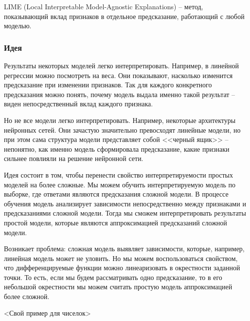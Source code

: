 LIME (Local Interpretable Model-Agnostic Explanations) -- метод, показывающий вклад признаков в отдельное предсказание, работающий с любой моделью.

\subsubsection{Идея}
Результаты некоторых моделей легко интерпретировать. Например, в линейной регрессии можно посмотреть на веса. Они показывают, насколько изменится предсказание при изменении признаков. Так для каждого конкретного предсказания можно понять, почему модель выдала именно такой результат -- виден непосредственный вклад каждого признака.

Но не все модели легко интерпретировать. Например, некоторые архитектуры нейронных сетей. Они зачастую значительно превосходят линейные модели, но при этом сама структура модели представляет собой <<черный ящик>> -- непонятно, как именно модель сформировала предсказание, какие признаки сильнее повлияли на решение нейронной сети.

Идея состоит в том, чтобы перенести свойство интерпретируемости простых моделей на более сложные. Мы можем обучить интерпретируемую модель по выборке, где ответами являются предсказания сложной модели. В процессе обучения модель анализирует зависимости непосредственно между признаками и предсказаниями сложной модели. Тогда мы сможем интерпретировать результаты простой модели, которые являются аппроксимацией предсказаний сложной модели.

Возникает проблема: сложная модель выявляет зависимости, которые, например, линейная модель может не уловить. Но мы можем воспользоваться свойством, что дифференцируемые функции можно линеаризовать в окрестности заданной точки. То есть, если мы будем рассматривать одно предсказание, то в его небольшой окрестности мы можем считать простую модель аппроксимацией более сложной.


<Свой пример для чиселок>